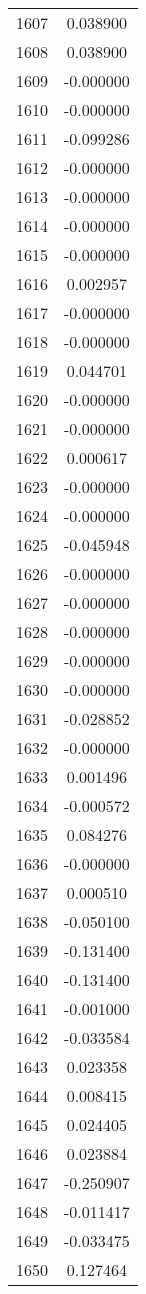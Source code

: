 \documentclass[12pt]{article}
\begin{document}
\begin{longtable}{@{}cc@{}}
1607 & 0.038900 \\
1608 & 0.038900 \\
1609 & -0.000000 \\
1610 & -0.000000 \\
1611 & -0.099286 \\
1612 & -0.000000 \\
1613 & -0.000000 \\
1614 & -0.000000 \\
1615 & -0.000000 \\
1616 & 0.002957 \\
1617 & -0.000000 \\
1618 & -0.000000 \\
1619 & 0.044701 \\
1620 & -0.000000 \\
1621 & -0.000000 \\
1622 & 0.000617 \\
1623 & -0.000000 \\
1624 & -0.000000 \\
1625 & -0.045948 \\
1626 & -0.000000 \\
1627 & -0.000000 \\
1628 & -0.000000 \\
1629 & -0.000000 \\
1630 & -0.000000 \\
1631 & -0.028852 \\
1632 & -0.000000 \\
1633 & 0.001496 \\
1634 & -0.000572 \\
1635 & 0.084276 \\
1636 & -0.000000 \\
1637 & 0.000510 \\
1638 & -0.050100 \\
1639 & -0.131400 \\
1640 & -0.131400 \\
1641 & -0.001000 \\
1642 & -0.033584 \\
1643 & 0.023358 \\
1644 & 0.008415 \\
1645 & 0.024405 \\
1646 & 0.023884 \\
1647 & -0.250907 \\
1648 & -0.011417 \\
1649 & -0.033475 \\
1650 & 0.127464 \\

\end{longtable}
\end{document}

